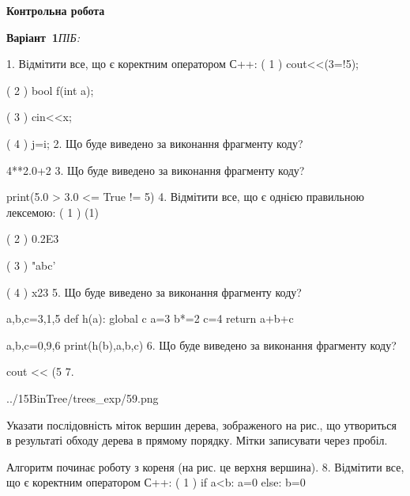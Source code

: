 \documentclass[11pt]{article}
\begin{document}
{\large\textbf{Контрольна робота}}

\textbf{Варіант \No\,1}\hfill \textit{ПІБ:}\,\underline{\hspace{60mm}}
\vspace{4mm}

1. %
Відмітити все, що є коректним оператором С++:
( 1 ) cout<<(3=!5);

( 2 ) bool f(int a);

( 3 ) cin<<x;

( 4 ) j=i;
\vspace{5mm}
2. Що буде виведено за виконання фрагменту коду?

4**2.0+2
\vspace{5mm}
3. Що буде виведено за виконання фрагменту коду?

print(5.0 > 3.0 <= True != 5)
\vspace{5mm}
4. %
Відмітити все, що є однією правильною лексемою:
( 1 ) (1)

( 2 ) 0.2E3

( 3 ) "abc'

( 4 ) x23
\vspace{5mm}
5. Що буде виведено за виконання фрагменту коду?

a,b,c=3,1,5
def h(a):
global c    a=3
    b*=2
    c=4
    return a+b+c

a,b,c=0,9,6
print(h(b),a,b,c)
\vspace{5mm}
6. Що буде виведено за виконання фрагменту коду?

cout << (5 %
\vspace{5mm}
7. 

\begin{center}
	{../15BinTree/trees_exp/59.png}
\end{center}
Указати послідовність міток вершин дерева, зображеного на рис., що утвориться в результаті обходу дерева в прямому порядку. Мітки записувати через пробіл.\par Алгоритм починає роботу з кореня (на рис. це верхня вершина).
\vspace{5mm}
8. %
Відмітити все, що є коректним оператором С++:
( 1 ) if a<b: a=0 else: b=0
\end{document}
